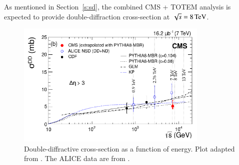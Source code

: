 \documentclass{webofc}
\def\un#1{\,{\rm #1}}
\begin{document}
As mentioned in Section~\ref{s:sd}, the combined CMS + TOTEM analysis is expected to provide double-diffraction cross-section at $\sqrt s = 8\un{TeV}$.

\begin{figure}[h]
\centering
\includegraphics[height=6cm,clip]{fig/si_dd_vs_s.pdf}
\vskip-4mm
\caption{Double-diffractive cross-section as a function of energy. Plot adapted from \cite{cms-diff-7tev}. The ALICE data are from \cite{alice-inel-sd-dd}.}
\label{f:dd cs summary}
\end{figure}


\end{document}
